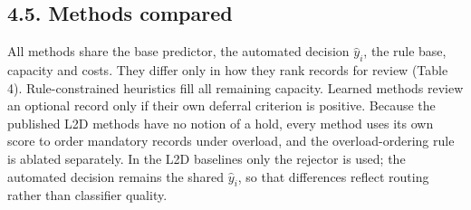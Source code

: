 \documentclass[
  11pt,
]{article}
\begin{document}
\hypertarget{methods-compared}{%
\subsection{4.5. Methods compared}\label{methods-compared}}

All methods share the base predictor, the automated decision
\(\hat y_i\), the rule base, capacity and costs. They differ only in how
they rank records for review (Table 4). Rule-constrained heuristics fill
all remaining capacity. Learned methods review an optional record only
if their own deferral criterion is positive. Because the published L2D
methods have no notion of a hold, every method uses its own score to
order mandatory records under overload, and the overload-ordering rule
is ablated separately. In the L2D baselines only the rejector is used;
the automated decision remains the shared \(\hat y_i\), so that
differences reflect routing rather than classifier quality.
\end{document}

